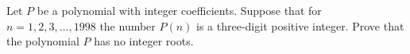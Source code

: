 Let $P$ be a polynomial with integer coefficients. Suppose that for $n=1,2,3,\ldots ,1998$ the number $P(n)$ is a three-digit positive integer. Prove that the polynomial $P$ has no integer roots.